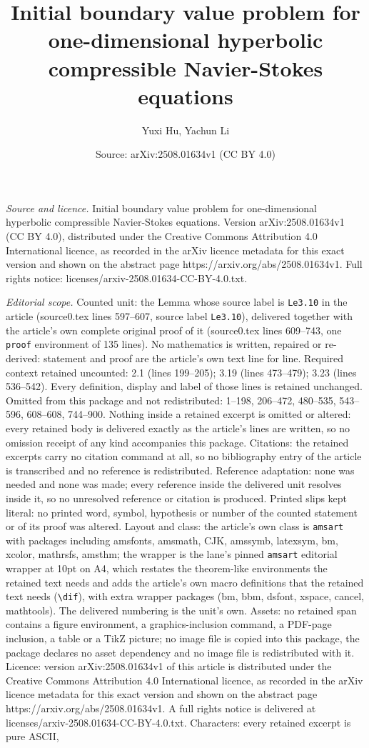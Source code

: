 \documentclass[10pt,a4paper]{amsart}
\title[Initial boundary value problem for one-dimensional hyperboli]{Initial boundary value problem for one-dimensional hyperbolic compressible Navier-Stokes equations}
\author{Yuxi Hu, Yachun Li}
\date{Source: arXiv:2508.01634v1 (CC BY 4.0)}
\begin{document}
\maketitle

\noindent\emph{Source and licence.} Initial boundary value problem for one-dimensional hyperbolic compressible Navier-Stokes equations. Version arXiv:2508.01634v1 (CC BY 4.0), distributed under the Creative Commons Attribution 4.0 International licence, as recorded in the arXiv licence metadata for this exact version and shown on the abstract page https://arxiv.org/abs/2508.01634v1. Full rights notice: licenses/arxiv-2508.01634-CC-BY-4.0.txt.\par\smallskip

\noindent\textit{Editorial scope.} Counted unit: the Lemma whose source label is \texttt{Le3.10} in the article (source0.tex lines 597--607, source label \texttt{Le3.10}), delivered together with the article's own complete original proof of it (source0.tex lines 609--743, one \texttt{proof} environment of 135 lines). No mathematics is written, repaired or re-derived: statement and proof are the article's own text line for line. Required context retained uncounted: 2.1 (lines 199--205); 3.19 (lines 473--479); 3.23 (lines 536--542). Every definition, display and label of those lines is retained unchanged. Omitted from this package and not redistributed: 1--198, 206--472, 480--535, 543--596, 608--608, 744--900. Nothing inside a retained excerpt is omitted or altered: every retained body is delivered exactly as the article's lines are written, so no omission receipt of any kind accompanies this package. Citations: the retained excerpts carry no citation command at all, so no bibliography entry of the article is transcribed and no reference is redistributed. Reference adaptation: none was needed and none was made; every reference inside the delivered unit resolves inside it, so no unresolved reference or citation is produced. Printed slips kept literal: no printed word, symbol, hypothesis or number of the counted statement or of its proof was altered. Layout and class: the article's own class is \texttt{amsart} with packages including amsfonts, amsmath, CJK, amssymb, latexsym, bm, xcolor, mathrsfs, amsthm; the wrapper is the lane's pinned \texttt{amsart} editorial wrapper at 10pt on A4, which restates the theorem-like environments the retained text needs and adds the article's own macro definitions that the retained text needs (\texttt{\textbackslash dif}), with extra wrapper packages (bm, bbm, dsfont, xspace, cancel, mathtools). The delivered numbering is the unit's own. Assets: no retained span contains a figure environment, a graphics-inclusion command, a PDF-page inclusion, a table or a TikZ picture; no image file is copied into this package, the package declares no asset dependency and no image file is redistributed with it. Licence: version arXiv:2508.01634v1 of this article is distributed under the Creative Commons Attribution 4.0 International licence, as recorded in the arXiv licence metadata for this exact version and shown on the abstract page https://arxiv.org/abs/2508.01634v1. A full rights notice is delivered at licenses/arxiv-2508.01634-CC-BY-4.0.txt. Characters: every retained excerpt is pure ASCII, 
\end{document}
